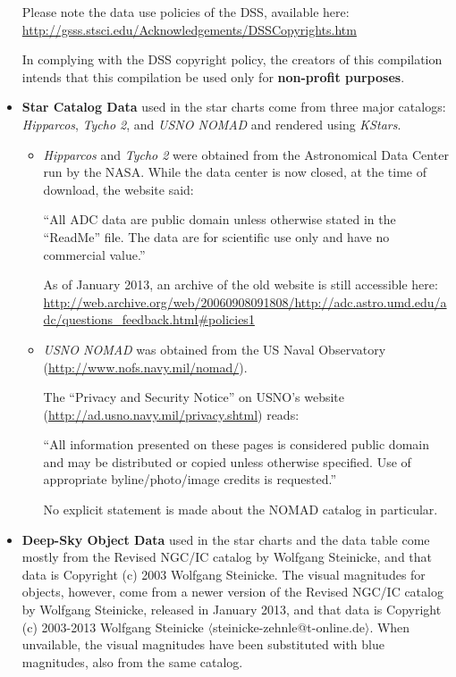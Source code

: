 \begin{itemize}
  Please note the data use policies of the DSS, available here:
  \url{http://gsss.stsci.edu/Acknowledgements/DSSCopyrights.htm}
  
  In complying with the DSS copyright policy, the creators of this
  compilation intends that this compilation be used only for
  \textbf{non-profit purposes}.

\item \textbf{Star Catalog Data} used in the star charts come from
  three major catalogs: \emph{Hipparcos}, \emph{Tycho 2}, and
  \emph{USNO NOMAD} and rendered using \emph{KStars}.

  \begin{itemize}
    \item \emph{Hipparcos} and \emph{Tycho 2} were obtained from the
      Astronomical Data Center run by the NASA. While the data center
      is now closed, at the time of download, the website said:

      ``All ADC data are public domain unless otherwise stated in the
      ``ReadMe'' file. The data are for scientific use only and have
      no commercial value.''

      As of January 2013, an archive of the old website is still
      accessible here:
      {\small \url{http://web.archive.org/web/20060908091808/http://adc.astro.umd.edu/adc/questions_feedback.html#policies1}}

    \item \emph{USNO NOMAD} was obtained from the US Naval Observatory
      (\url{http://www.nofs.navy.mil/nomad/}).

      The ``Privacy and Security Notice'' on USNO's website
      (\url{http://ad.usno.navy.mil/privacy.shtml}) reads:

      ``All information presented on these pages is considered public
      domain and may be distributed or copied unless otherwise
      specified. Use of appropriate byline/photo/image credits is
      requested.''

      No explicit statement is made about the NOMAD catalog in
      particular.
  \end{itemize}

\item \textbf{Deep-Sky Object Data} used in the star charts and the
  data table come mostly from the Revised NGC/IC catalog by Wolfgang
  Steinicke, and that data is Copyright (c) 2003 Wolfgang
  Steinicke. The visual magnitudes for objects, however, come from a
  newer version of the Revised NGC/IC catalog by Wolfgang Steinicke,
  released in January 2013, and that data is Copyright (c) 2003-2013
  Wolfgang Steinicke
  $\langle$steinicke-zehnle@t-online.de$\rangle$. When unvailable, the
  visual magnitudes have been substituted with blue magnitudes, also
  from the same catalog.


\end{itemize}
